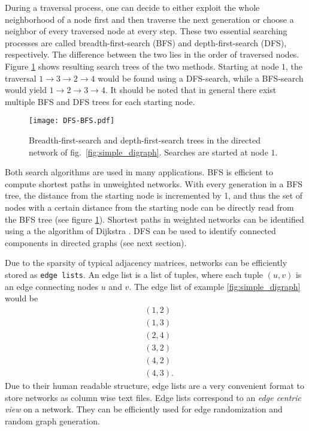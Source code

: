 During a traversal process, one can decide to either exploit the whole neighborhood of a node first and then traverse the next generation or choose a neighbor of every traversed node at every step.
These two essential searching processes are called breadth-first-search (BFS) and depth-first-search (DFS), respectively.
The difference between the two lies in the order of traversed nodes.
Figure \ref{fig:dfs_bfs} shows resulting search trees of the two methods.
Starting at node $1$, the traversal $1\rightarrow 3 \rightarrow 2 \rightarrow 4$ would be found using a DFS-search, while a BFS-search would yield $1\rightarrow 2 \rightarrow 3 \rightarrow 4$.
It should be noted that in general there exist multiple BFS and DFS trees for each starting node. 
%
\begin{figure}[htbp]
\begin{center}
\texttt{[image: DFS-BFS.pdf]}
\caption{Breadth-first-search and depth-first-search trees in the directed network of fig.~\ref{fig:simple_digraph}. Searches are started at node $1$.}
\label{fig:dfs_bfs}
\end{center}
\end{figure}

Both search algorithms are used in many applications.
BFS is efficient to compute shortest paths in unweighted networks.
With every generation in a BFS tree, the distance from the starting node is incremented by 1, and thus the set of nodes with a certain distance from the starting node can be directly read from the BFS tree (see figure \ref{fig:dfs_bfs}).
Shortest paths in weighted networks can be identified using a the algorithm of Dijkstra \citep{Dijkstra:1959}.
DFS can be used to identify connected components in directed graphs (see next section).

Due to the sparsity of typical adjacency matrices, networks can be efficiently stored as \verb"edge lists".
An edge list is a list of tuples, where each tuple $(u,v)$ is an edge connecting nodes $u$ and $v$.
The edge list of example \ref{fig:simple_digraph} would be
\begin{align*}
&(1,2)\\
&(1,3)\\
&(2,4)\\
&(3,2)\\
&(4,2)\\
&(4,3) .
\end{align*}
Due to their human readable structure, edge lists are a very convenient format to store networks as column wise text files.
Edge lists correspond to an \emph{edge centric view} on a network.
They can be efficiently used for edge randomization and random graph generation.

